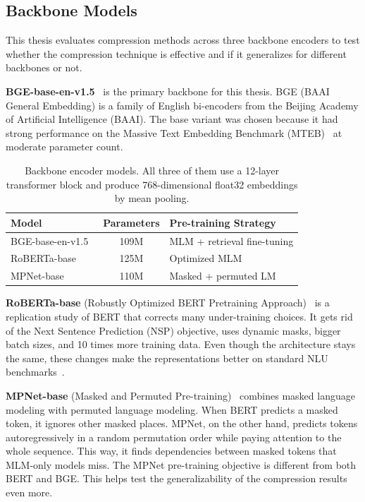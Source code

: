 \subsection{Backbone Models}

This thesis evaluates compression methods across three backbone encoders to test whether the compression technique is effective and if it generalizes for different backbones or not.

\textbf{BGE-base-en-v1.5}~\cite{xiao2023c} is the primary backbone for this thesis. BGE (BAAI General Embedding) is a family of English bi-encoders from the Beijing Academy of Artificial Intelligence (BAAI). The base variant was chosen because it had strong performance on the Massive Text Embedding Benchmark (MTEB)~\cite{muennighoff2022mteb} at moderate parameter count.

\begin{table}[H]
  \centering
  \caption[Backbone encoder models used in this thesis]{Backbone encoder models. All three of them use a 12-layer transformer block and produce 768-dimensional float32 embeddings by mean pooling.}
  \label{tab:backbones}
  \begin{tabular}{| l | c | l |}
    \hline
    \textbf{Model} & \textbf{Parameters} & \textbf{Pre-training Strategy} \\ [0.5ex] \hline
    BGE-base-en-v1.5~\cite{xiao2023c}    & 109M & MLM + retrieval fine-tuning \\ \hline
    RoBERTa-base~\cite{liu2019roberta}   & 125M & Optimized MLM \\ \hline
    MPNet-base~\cite{song2020mpnet}      & 110M & Masked + permuted LM \\ \hline
  \end{tabular}
\end{table}

\textbf{RoBERTa-base} (Robustly Optimized BERT Pretraining Approach)~\cite{liu2019roberta} is a replication study of BERT that corrects many under-training choices. It gets rid of the Next Sentence Prediction (NSP) objective, uses dynamic masks, bigger batch sizes, and 10 times more training data. Even though the architecture stays the same, these changes make the representations better on standard NLU benchmarks~\cite{wang2018glue, rajpurkar2016squad}.

\textbf{MPNet-base} (Masked and Permuted Pre-training)~\cite{song2020mpnet} combines masked language modeling with permuted language modeling. When BERT predicts a masked token, it ignores other masked places. MPNet, on the other hand, predicts tokens autoregressively in a random permutation order while paying attention to the whole sequence. This way, it finds dependencies between masked tokens that MLM-only models miss. The MPNet pre-training objective is different from both BERT and BGE. This helps test the generalizability of the compression results even more.

